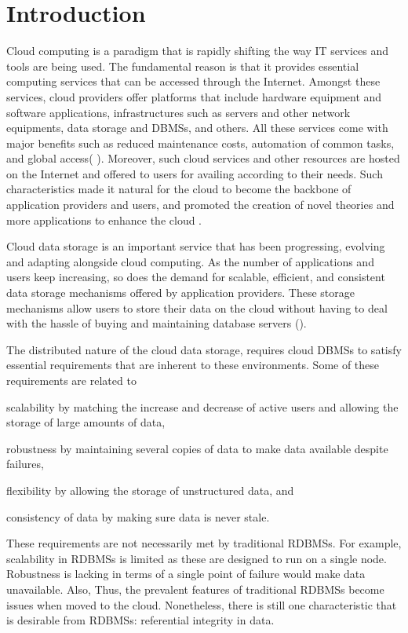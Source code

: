 \chapter{Introduction}

% 
  
Cloud computing is a paradigm that is rapidly shifting the way IT services
and tools are being used. The fundamental reason is that it provides
 essential computing services that can be accessed through the Internet. 
 Amongst these services, cloud providers offer platforms that
 include hardware equipment and software applications, infrastructures such as
 servers and other network equipments, data storage and \acp{DBMS}, and
 others. All these services come with major benefits such as reduced maintenance
 costs,  automation of common tasks, and global access( ). Moreover, such cloud
 services and other resources are hosted on the Internet and offered to  
 users for availing according to their needs.  Such characteristics made it
  natural for the  cloud to become  the backbone of application providers and
  users, and promoted the creation of novel theories and more applications to
 enhance the cloud .
 
  
  Cloud data storage is an important service that has been progressing, evolving
  and adapting alongside cloud computing. As the number of
  applications and users keep increasing, so does the demand for scalable, 
  efficient, and consistent data storage mechanisms offered by
  application providers. These storage mechanisms allow  users to store
  their data on the cloud without having to deal with the hassle of buying and
  maintaining database servers ().

 The distributed nature of the cloud data storage, requires
 cloud \acp{DBMS} to satisfy essential requirements that are inherent to these
 environments. Some of these requirements are related to
  \begin{inparaenum}[a)]
 \item  scalability by matching the increase and decrease of active users
 and allowing the storage of large amounts of data,
 \item  robustness by maintaining several copies of data to make data
 available despite failures,
 \item  flexibility by allowing the storage of unstructured data, and
 \item  consistency of data by making sure data is never stale.
 \end{inparaenum}
   These requirements are not necessarily met by traditional \acp{RDBMS}. For
   example, scalability in \acp{RDBMS} is limited as these are designed to run
   on a single node. Robustness is lacking in terms of  a single point of
   failure would  make data unavailable. Also,     Thus, the  prevalent
   features of traditional \acp{RDBMS}  become issues when moved to the cloud.
    Nonetheless, there is still one characteristic that is desirable from
   \acp{RDBMS}: referential integrity in data.
   
